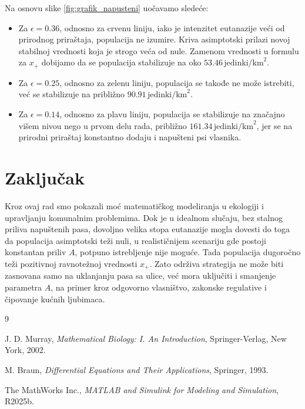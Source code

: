 \documentclass[12pt]{article}
\begin{document}
Na osnovu slike \ref{fig:grafik_napusteni} uočavamo sledeće:
\begin{itemize}
    \item Za $\epsilon = 0.36$, odnosno za crvenu liniju, iako je intenzitet eutanazije veći od prirodnog priraštaja, populacija ne izumire. Kriva asimptotski prilazi novoj stabilnoj vrednosti koja je strogo veća od nule. Zamenom vrednosti u formulu za $x_+$ dobijamo da se populacija stabilizuje na oko $53.46 \, \text{jedinki/km}^2$.
    \item Za $\epsilon = 0.25$, odnosno za zelenu liniju, populacija se takođe ne može istrebiti, već se stabilizuje na približno $90.91 \, \text{jedinki/km}^2$.
    \item Za $\epsilon = 0.14$, odnosno za plavu liniju, populacija se stabilizuje na značajno višem nivou nego u prvom delu rada, približno $161.34 \, \text{jedinki/km}^2$, jer se na prirodni priraštaj konstantno dodaju i napušteni psi vlasnika.
\end{itemize}

\section{Zaključak}

Kroz ovaj rad smo pokazali moć matematičkog modeliranja u ekologiji i upravljanju komunalnim problemima. Dok je u idealnom slučaju, bez stalnog priliva napuštenih pasa, dovoljno velika stopa eutanazije mogla dovesti do toga da populacija asimptotski teži nuli, u realističnijem scenariju gde postoji konstantan priliv $A$, potpuno istrebljenje nije moguće. Tada populacija dugoročno teži pozitivnoj ravnotežnoj vrednosti $x_+$. Zato održiva strategija ne može biti zasnovana samo na uklanjanju pasa sa ulice, već mora uključiti i smanjenje parametra $A$, na primer kroz odgovorno vlasništvo, zakonske regulative i čipovanje kućnih ljubimaca.

\newpage
\begin{thebibliography}{9}

J. D. Murray, \textit{Mathematical Biology: I. An Introduction}, Springer-Verlag, New York, 2002.

M. Braun, \textit{Differential Equations and Their Applications}, Springer, 1993.

The MathWorks Inc., \textit{MATLAB and Simulink for Modeling and Simulation}, R2025b.

\end{thebibliography}
\end{document}
